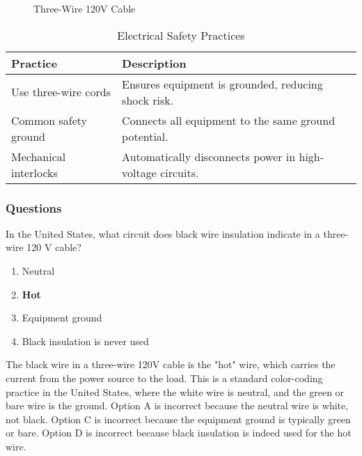\begin{figure}[h]
    \centering
    \caption{Three-Wire 120V Cable}
    \label{fig:three-wire-cable}
\end{figure}

\begin{table}[h]
    \centering
    \begin{tabular}{|l|l|}
        \hline
        \textbf{Practice} & \textbf{Description} \\
        \hline
        Use three-wire cords & Ensures equipment is grounded, reducing shock risk. \\
        Common safety ground & Connects all equipment to the same ground potential. \\
        Mechanical interlocks & Automatically disconnects power in high-voltage circuits. \\
        \hline
    \end{tabular}
    \caption{Electrical Safety Practices}
    \label{tab:safety-practices}
\end{table}

\subsubsection*{Questions}

\begin{tcolorbox}[colback=gray!10!white,colframe=black!75!black,title={T0A03}]
    In the United States, what circuit does black wire insulation indicate in a three-wire 120 V cable?
    \begin{enumerate}[label=\Alph*),noitemsep]
        \item Neutral
        \item \textbf{Hot}
        \item Equipment ground
        \item Black insulation is never used
    \end{enumerate}
\end{tcolorbox}

The black wire in a three-wire 120V cable is the "hot" wire, which carries the current from the power source to the load. This is a standard color-coding practice in the United States, where the white wire is neutral, and the green or bare wire is the ground. Option A is incorrect because the neutral wire is white, not black. Option C is incorrect because the equipment ground is typically green or bare. Option D is incorrect because black insulation is indeed used for the hot wire.

